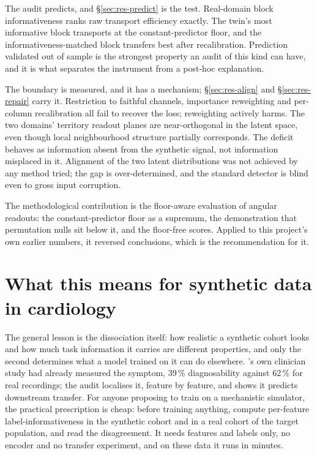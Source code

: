 The audit predicts, and \S\ref{sec:res-predict} is the test. Real-domain block informativeness ranks raw transport efficiency exactly. The twin's most informative block transports at the constant-predictor floor, and the informativeness-matched block transfers best after recalibration. Prediction validated out of sample is the strongest property an audit of this kind can have, and it is what separates the instrument from a post-hoc explanation.

The boundary is measured, and it has a mechanism; \S\ref{sec:res-align} and \S\ref{sec:res-repair} carry it. Restriction to faithful channels, importance reweighting and per-column recalibration all fail to recover the loss; reweighting actively harms. The two domains' territory readout planes are near-orthogonal in the latent space, even though local neighbourhood structure partially corresponds. The deficit behaves as information absent from the synthetic signal, not information misplaced in it. Alignment of the two latent distributions was not achieved by any method tried; the gap is over-determined, and the standard detector is blind even to gross input corruption.

The methodological contribution is the floor-aware evaluation of angular readouts: the constant-predictor floor as a supremum, the demonstration that permutation nulls sit below it, and the floor-free scores. Applied to this project's own earlier numbers, it reversed conclusions, which is the recommendation for it.

\section{What this means for synthetic data in cardiology}
\label{sec:conc-meaning}

The general lesson is the dissociation itself: how realistic a synthetic cohort looks and how much task information it carries are different properties, and only the second determines what a model trained on it can do elsewhere. \medalcare's own clinician study had already measured the symptom, 39\,\% diagnosability against 62\,\% for real recordings; the audit localises it, feature by feature, and shows it predicts downstream transfer. For anyone proposing to train on a mechanistic simulator, the practical prescription is cheap: before training anything, compute per-feature label-informativeness in the synthetic cohort and in a real cohort of the target population, and read the disagreement. It needs features and labels only, no encoder and no transfer experiment, and on these data it runs in minutes.

